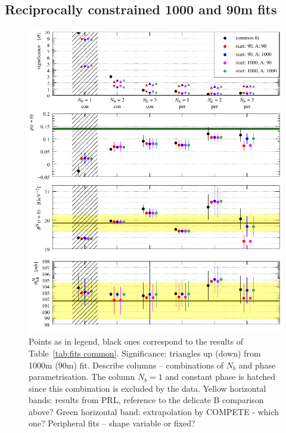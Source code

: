 \subsection{Reciprocally constrained 1000 and 90m fits}


\begin{figure}
\begin{center}
\includegraphics{fig/fits_reciprocal_derived.pdf}
\caption{
Points as in legend, black ones correspond to the results of Table~\ref{tab:fits common}. Significance: triangles up (down) from 1000m (90m) fit. Describe columns -- combinations of $N_b$ and phase parametrisation. The column $N_b=1$ and constant phase is hatched since this combination is excluded by the data. Yellow horizontal bands: results from PRL, reference to the delicate B comparison above? Green horizontal band: extrapolation by COMPETE - which one? Peripheral fits -- shape variable or fixed?
}
\label{fig:fits reciprocal der}
\end{center}
\end{figure}
